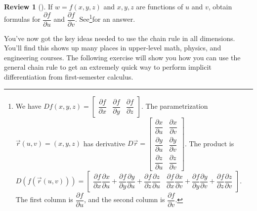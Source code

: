 \documentclass[10pt,]{book}
\theoremstyle{plain}
\theoremstyle{definition}
\theoremstyle{definition}
\theoremstyle{definition}
\newtheorem{project}{Review}[section]
\theoremstyle{definition}
\theoremstyle{definition}
\numberwithin{equation}{section}
\newcommand{\amp}{&}
\begin{document}
\begin{project}[]\label{project-6}
If \(w=f(x,y,z)\) and \(x,y,z\) are functions of \(u\) and \(v\), obtain formulas for \(\dfrac{\partial f}{\partial u}\) and \(\dfrac{\partial f}{\partial v}\). See\footnote{We have \(Df(x,y,z)
=\begin{bmatrix}\dfrac{\partial f}{\partial x}\amp \dfrac{\partial f}{\partial y}\amp \dfrac{\partial f}{\partial z}
\end{bmatrix}\). The parametrization \(\vec r(u,v)=(x,y,z)\) has derivative \(D\vec r 
=\begin{bmatrix}\dfrac{\partial x}{\partial u}\amp \dfrac{\partial x}{\partial v}\\
\dfrac{\partial y}{\partial u}\amp \dfrac{\partial y}{\partial v}\\
\dfrac{\partial z}{\partial u}\amp \dfrac{\partial z}{\partial v}
\end{bmatrix}\). The product is \(D(f(\vec r(u,v)))
=\begin{bmatrix}\dfrac{\partial f}{\partial x}\dfrac{\partial x}{\partial u}+
\dfrac{\partial f}{\partial y}\dfrac{\partial y}{\partial u}+
\dfrac{\partial f}{\partial z}\dfrac{\partial z}{\partial u}\amp 
\dfrac{\partial f}{\partial x}\dfrac{\partial x}{\partial v}+
\dfrac{\partial f}{\partial y}\dfrac{\partial y}{\partial v}+
\dfrac{\partial f}{\partial z}\dfrac{\partial z}{\partial v}
\end{bmatrix}\). The first column is \(\dfrac{\partial f}{\partial u}\), and the second column is \(\dfrac{\partial f}{\partial v}\).\label{fn-5}}for an answer.%
\end{project}
You've now got the key ideas needed to use the chain rule in all dimensions. You'll find this shows up many places in upper-level math, physics, and engineering courses. The following exercise will show you how you can use the general chain rule to get an extremely quick way to perform implicit differentiation from first-semester calculus.%
\end{document}
